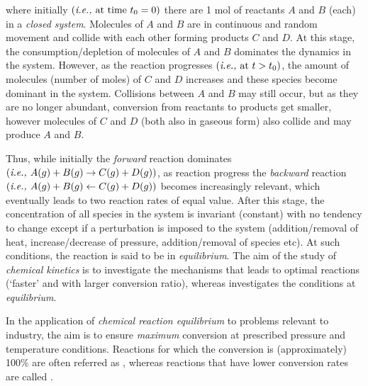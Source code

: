 \noindent where initially $\left(\text{{\it i.e., }at time } t_{0}=0\right)$ there are 1 mol of reactants $A$ and $B$ (each) in a {\it closed system}. Molecules of $A$ and $B$ are in continuous and random movement and collide with each other forming products $C$ and $D$. At this stage, the consumption/depletion of molecules of $A$ and $B$ dominates the dynamics in the system. However, as the reaction progresses $\left(\text{{\it i.e., }at } t > t_{0}\right)$, the amount of molecules (\ie number of moles) of $C$ and $D$ increases and these species become dominant in the system. Collisions between $A$ and $B$ may still occur, but as they are no longer abundant, conversion from reactants to products get smaller, however molecules of $C$ and $D$ (both also in gaseous form) also collide and may produce $A$ and $B$. 

Thus, while initially the {\it forward} reaction dominates $\left(\text{{\it i.e., }} A (g) + B (g) \rightarrow C (g) + D (g)\right)$, as reaction progress the {\it backward} reaction $\left(\text{{\it i.e., }} A (g) + B (g) \leftarrow C (g) + D (g)\right)$ becomes increasingly relevant, which eventually leads to two reaction rates of equal value. After this stage, the concentration of all species in the system is invariant (\ie constant) with no tendency to change except if a perturbation is imposed to the system (\eg addition/removal of heat, increase/decrease of pressure, addition/removal of species etc). At such conditions, the reaction is said to be in {\it equilibrium}. The aim of the study of {\it chemical kinetics} is to investigate the mechanisms that leads to optimal reactions (\ie `faster' and with larger conversion ratio), whereas  investigates the conditions at {\it equilibrium}.

In the application of {\it chemical reaction equilibrium} to problems relevant to industry, the aim is to ensure {\it maximum} conversion at prescribed pressure and temperature conditions. Reactions for which the conversion is (approximately) 100$\%$ are often referred as , whereas reactions that have lower conversion rates are called .

